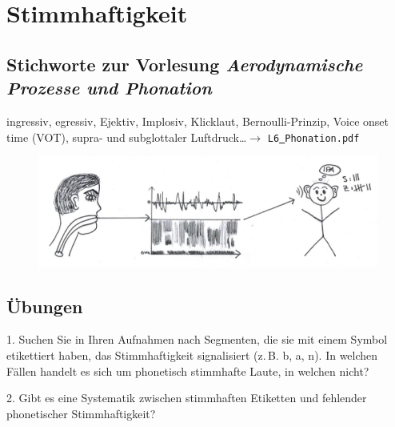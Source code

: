 \documentclass[11pt]{book}
\begin{document}
\chapter{Stimmhaftigkeit}

\section{Stichworte zur Vorlesung \em{Aerodynamische Prozesse und Phonation}}

ingressiv, egressiv, Ejektiv, Implosiv, Klicklaut, Bernoulli-Prinzip, Voice onset time (VOT), supra- und subglottaler Luftdruck\dots $\rightarrow$ {\tt L6\underline{\ }Phonation.pdf}

\begin{figure}[htbp]
\begin{center}
\includegraphics[width=\textwidth]{grafiken/stimmhaftigkeit/stimmhaftigkeit}
\label{t4}
\end{center}
\end{figure}


\newpage
\section{Übungen}

1.	Suchen Sie in Ihren Aufnahmen nach Segmenten, die sie mit einem Symbol etikettiert haben, das Stimmhaftigkeit signalisiert (z.\,B. b, a, n). In welchen Fällen handelt es sich um phonetisch stimmhafte Laute, in welchen nicht?
\vspace{4cm}

2.	Gibt es eine Systematik zwischen stimmhaften Etiketten und fehlender phonetischer Stimmhaftigkeit?
\vspace{4cm}
\end{document}
